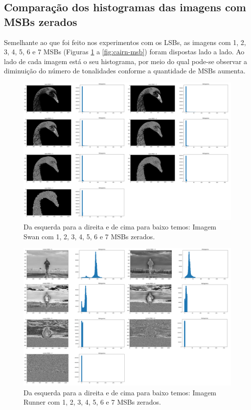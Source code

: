 
\subsection{Comparação dos histogramas das imagens com MSBs zerados}

Semelhante ao que foi feito nos experimentos com os LSBs, as imagens com 1, 2, 3, 4, 5, 6 e 7 MSBs (Figuras \ref{fig:swan-msb} a \ref{fig:cairn-msb}) foram dispostas lado a lado. Ao lado de cada imagem está o seu histograma, por meio do qual pode-se observar a diminuição do número de tonalidades conforme a quantidade de MSBs aumenta. 

\begin{figure}[h!]
    \includegraphics[width=1\linewidth]{Elementos//Figuras/swan_msb.png}
    \caption{Da esquerda para a direita e de cima para baixo temos: Imagem Swan com 1, 2, 3, 4, 5, 6 e 7 MSBs zerados.}
    \label{fig:swan-msb}
\end{figure}

\begin{figure}[h!]
    \includegraphics[width=1\linewidth]{Elementos//Figuras/runner_msb.png}
    \caption{Da esquerda para a direita e de cima para baixo temos: Imagem Runner com 1, 2, 3, 4, 5, 6 e 7 MSBs zerados.}
    \label{fig:runner-msb}
\end{figure}

